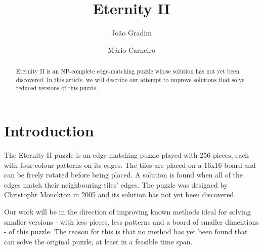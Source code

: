 \documentclass{llncs}
\begin{document}
%
\frontmatter          %
%
\pagestyle{headings}  %
%

\mainmatter              %
%
\title{Eternity II}
%
%
\author{João Gradim \and Mário Carneiro}
%
%
%

\maketitle              %

\begin{abstract}
Eternity II is an NP-complete edge-matching puzzle whose solution has not yet been discovered. In this article, we will describe our attempt to improve solutions that solve reduced versions of this puzzle.
\end{abstract}
%
\section{Introduction}


The Eternity II puzzle is an edge-matching puzzle played with 256 pieces, each with four colour patterns on its edges. The tiles are placed on a 16x16 board and can be freely rotated before being placed. A solution is found when all of the edges match their neighbouring tiles' edges. The puzzle was designed by Christophr Monckton in 2005 and its solution has not yet been discovered. 

Our work will be in the direction of improving known methods ideal for solving smaller versions - with less pieces, less patterns and a board of smaller dimentions - of this puzzle. The reason for this is that no method has yet been found that can solve the original puzzle, at least in a feasible time span. 
\end{document}
